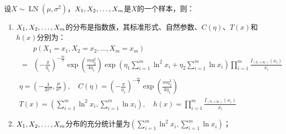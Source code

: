 \begin{theorem}
	设$X\sim\operatorname{LN}(\mu,\sigma^2)$，$X_1, X_2, \dots, X_{m}$是$X$的一个样本，则：
	\begin{enumerate}
		\item $X_1, X_2, \dots, X_{m}$的分布是指数族，其标准形式、自然参数、$C(\eta)$、$T(x)$和$h(x)$分别为：
		\begin{gather*}
			\begin{aligned}
				&p(X_1=x_1,X_2=x_2,\dots,X_m=x_m) \\
				=&\left(-\frac{\pi}{\eta_1}\right)^{-\frac{m}{2}}\exp\left(\frac{m\eta_2^2}{4\eta_1}\right)\exp\left(\eta_1\sum_{i=1}^{m}\ln^2 x_i+\eta_2\sum_{i=1}^{m}\ln x_i\right)\prod_{i=1}^{m}\frac{I_{(0,+\infty)}(x_i)}{x_i}
			\end{aligned} \\
			\eta=\left(-\frac{1}{2\sigma^2},\frac{\mu}{\sigma^2}\right),\quad C(\eta)=\left(-\frac{\pi}{\eta_1}\right)^{-\frac{m}{2}}\exp\left(\frac{m\eta_2^2}{4\eta_1}\right) \\
			T(x)=\left(\sum_{i=1}^{m}\ln^2 x_i,\sum_{i=1}^{m}\ln x_i\right),\quad h(x)=\prod_{i=1}^{m}\frac{I_{(0,+\infty)}(x_i)}{x_i}
		\end{gather*}
		\item $X_1, X_2, \dots, X_{m}$分布的充分统计量为$\left(\sum\limits_{i=1}^{m}\ln^2 x_i,\sum\limits_{i=1}^{m}\ln x_i\right)$；
	\end{enumerate}
\end{theorem}
